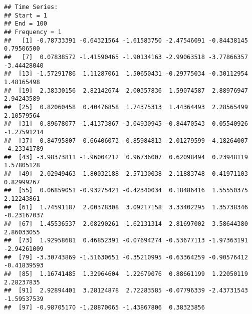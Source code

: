 \documentclass[
]{article}
\begin{document}
\begin{verbatim}
## Time Series:
## Start = 1 
## End = 100 
## Frequency = 1 
##   [1] -0.78733391 -0.64321564 -1.61583750 -2.47546091 -0.84438145  0.79506500
##   [7]  0.07838572 -1.41590465 -1.90134163 -2.99063518 -3.77866357 -3.44428040
##  [13] -1.57291786  1.11287061  1.50650431 -0.29775034 -0.30112954  1.48165498
##  [19]  2.38330156  2.82142674  2.00357836  1.59074587  2.88976947  2.94243589
##  [25]  0.82060458  0.40476858  1.74375313  1.44364493  2.28565499  2.10579564
##  [31]  0.89678077 -1.41373867 -3.04930945 -0.84470543  0.05540926 -1.27591214
##  [37] -0.84795807 -0.66406073 -0.85984813 -2.01279599 -4.18264007 -4.23341789
##  [43] -3.98373811 -1.96004212  0.96736007  0.62098494  0.23948119  1.57805128
##  [49]  2.02949463  1.80032188  2.57130038  2.11883748  0.41971103  0.82999267
##  [55]  0.06859051 -0.93275421 -0.42340034  0.18486416  1.55550375  2.12243861
##  [61]  1.74591187  2.00378308  3.09217158  3.33402295  1.35738346 -0.23167037
##  [67]  1.45536537  2.08290261  1.62131314  2.81697002  3.58644380  2.86033055
##  [73]  1.92958681  0.46852391 -0.07694274 -0.53677113 -1.97363191 -2.94261009
##  [79] -3.30743869 -1.51630651 -0.35210995 -0.63364259 -0.90576412 -0.41839593
##  [85]  1.16741485  1.32964604  1.22679076  0.88661199  1.22050119  2.28237835
##  [91]  2.92894401  3.28124878  2.72283585 -0.07796339 -2.43731543 -1.59537539
##  [97] -0.98705170 -1.28870065 -1.43867806  0.38323856
\end{verbatim}
\end{document}
